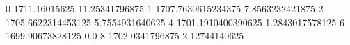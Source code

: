 0 1711.16015625 11.25341796875
1 1707.7630615234375 7.8563232421875
2 1705.6622314453125 5.7554931640625
4 1701.1910400390625 1.2843017578125
6 1699.90673828125 0.0
8 1702.0341796875 2.12744140625
